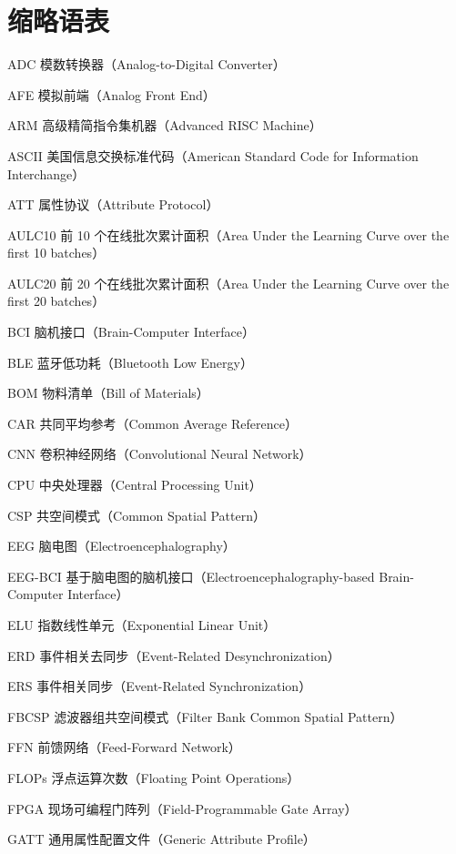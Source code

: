 \chapter*{缩略语表}

\begin{denotation}

\item[ADC] 模数转换器（Analog-to-Digital Converter）
\item[AFE] 模拟前端（Analog Front End）
\item[ARM] 高级精简指令集机器（Advanced RISC Machine）
\item[ASCII] 美国信息交换标准代码（American Standard Code for Information Interchange）
\item[ATT] 属性协议（Attribute Protocol）
\item[AULC10] 前 10 个在线批次累计面积（Area Under the Learning Curve over the first 10 batches）
\item[AULC20] 前 20 个在线批次累计面积（Area Under the Learning Curve over the first 20 batches）
\item[BCI] 脑机接口（Brain-Computer Interface）
\item[BLE] 蓝牙低功耗（Bluetooth Low Energy）
\item[BOM] 物料清单（Bill of Materials）
\item[CAR] 共同平均参考（Common Average Reference）
\item[CNN] 卷积神经网络（Convolutional Neural Network）
\item[CPU] 中央处理器（Central Processing Unit）
\item[CSP] 共空间模式（Common Spatial Pattern）
\item[EEG] 脑电图（Electroencephalography）
\item[EEG-BCI] 基于脑电图的脑机接口（Electroencephalography-based Brain-Computer Interface）
\item[ELU] 指数线性单元（Exponential Linear Unit）
\item[ERD] 事件相关去同步（Event-Related Desynchronization）
\item[ERS] 事件相关同步（Event-Related Synchronization）
\item[FBCSP] 滤波器组共空间模式（Filter Bank Common Spatial Pattern）
\item[FFN] 前馈网络（Feed-Forward Network）
\item[FLOPs] 浮点运算次数（Floating Point Operations）
\item[FPGA] 现场可编程门阵列（Field-Programmable Gate Array）
\item[GATT] 通用属性配置文件（Generic Attribute Profile）

\end{denotation}
